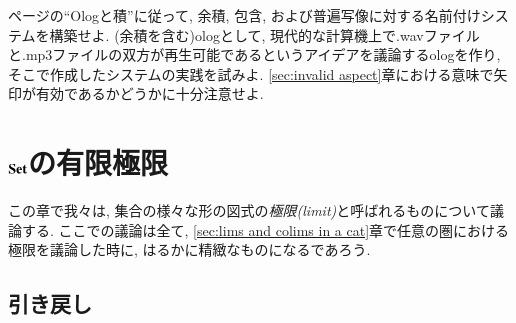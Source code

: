 \begin{exercise}

\pageref{sec:ologging products}ページの``Ologと積''に従って, 余積, 包含, および普遍写像に対する名前付けシステムを構築せよ. (余積を含む)ologとして, 現代的な計算機上で.wavファイルと.mp3ファイルの双方が再生可能であるというアイデアを議論するologを作り, そこで作成したシステムの実践を試みよ. \ref{sec:invalid aspect}章における意味で矢印が有効であるかどうかに十分注意せよ.
\end{exercise}


\section{${\bf Set}$の有限極限}\label{sec:finite limits}


この章で我々は, 集合の様々な形の図式の\emph{極限(limit)}と呼ばれるものについて議論する. ここでの議論は全て, \ref{sec:lims and colims in a cat}章で任意の圏における極限を議論した時に, はるかに精緻なものになるであろう.


\subsection{引き戻し}

